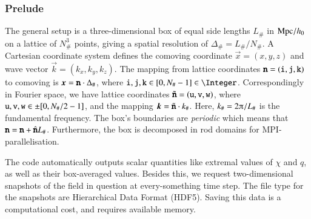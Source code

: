 






\subsubsection{Prelude}

The general setup is a three-dimensional box of equal side lengths $L_\#$ in $\mathrm{Mpc}/h_0$ on a lattice of $N_\#^3$ points, giving a spatial resolution of $\Delta_\#=L_\#/N_\#$. %
A Cartesian coordinate system defines the comoving coordinate $\vec{x}=(x,y,z)$ and wave vector $\vec{k}=(k_x, k_y, k_z)$. The mapping from lattice coordinates $\boldsymbol{\mathtt{n}}= (\mathtt{i}, \mathtt{j}, \mathtt{k})$ to comoving is $\boldsymbol{x}=\boldsymbol{\mathtt{n}}\cdot  \Delta_\#$, where $\lcoord{i},\lcoord{j}, \lcoord{k}\in [0, N_\#-1]\in \Integer$. 
Correspondingly in Fourier space, we have lattice coordinates $\tilde{\boldsymbol{\mathtt{n}}} =(\mathtt{u}, \mathtt{v}, \mathtt{w})$, where $\mathtt{u}, \mathtt{v}, \mathtt{w} \in\pm[0, N_\#/2-1]$, and the mapping $\boldsymbol{k} =\tilde{\boldsymbol{\mathtt{n}}} \cdot k_\# $. Here,  $k_\#=2\ppi/L_\#$ is the fundamental frequency. 
The box's boundaries are \emph{periodic} which means that $\boldsymbol{\mathtt{n}} = \boldsymbol{\mathtt{n}} + \hat{\boldsymbol{\mathtt{n}}}L_\#$. Furthermore, the box is decomposed in rod domains for MPI-parallelisation.


The code automatically outputs scalar quantities like extremal values of $\chi$ and $q$, as well as their box-averaged values. Besides this, we request two-dimensional snapshots of the field in question at every-something time step. The file type for the snapshots are Hierarchical Data Format (HDF5). Saving this data is a computational cost, and requires available memory. %






